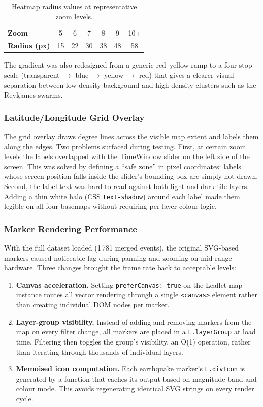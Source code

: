 \documentclass[12pt]{article}
\begin{document}
\begin{table}[H]
\centering
\small
\begin{tabular}{l c c c c c c}
\hline
\textbf{Zoom} & 5 & 6 & 7 & 8 & 9 & 10+ \\
\textbf{Radius (px)} & 15 & 22 & 30 & 38 & 48 & 58 \\
\hline
\end{tabular}
\caption{Heatmap radius values at representative zoom levels.}
\label{tab:heatmap-radii}
\end{table}

The gradient was also redesigned from a generic red--yellow ramp to a four-stop scale (transparent $\rightarrow$ blue $\rightarrow$ yellow $\rightarrow$ red) that gives a clearer visual separation between low-density background and high-density clusters such as the Reykjanes swarms.

\subsubsection{Latitude/Longitude Grid Overlay}

The grid overlay draws degree lines across the visible map extent and labels them along the edges. Two problems surfaced during testing. First, at certain zoom levels the labels overlapped with the TimeWindow slider on the left side of the screen. This was solved by defining a ``safe zone'' in pixel coordinates: labels whose screen position falls inside the slider's bounding box are simply not drawn. Second, the label text was hard to read against both light and dark tile layers. Adding a thin white halo (CSS \texttt{text-shadow}) around each label made them legible on all four basemaps without requiring per-layer colour logic.

\subsubsection{Marker Rendering Performance}

With the full dataset loaded (1\,781 merged events), the original SVG-based markers caused noticeable lag during panning and zooming on mid-range hardware. Three changes brought the frame rate back to acceptable levels:

\begin{enumerate}
    \item \textbf{Canvas acceleration.} Setting \texttt{preferCanvas: true} on the Leaflet map instance routes all vector rendering through a single \texttt{<canvas>} element rather than creating individual DOM nodes per marker.
    \item \textbf{Layer-group visibility.} Instead of adding and removing markers from the map on every filter change, all markers are placed in a \texttt{L.layerGroup} at load time. Filtering then toggles the group's visibility, an O(1) operation, rather than iterating through thousands of individual layers.
    \item \textbf{Memoised icon computation.} Each earthquake marker's \texttt{L.divIcon} is generated by a function that caches its output based on magnitude band and colour mode. This avoids regenerating identical SVG strings on every render cycle.
\end{enumerate}
\end{document}
